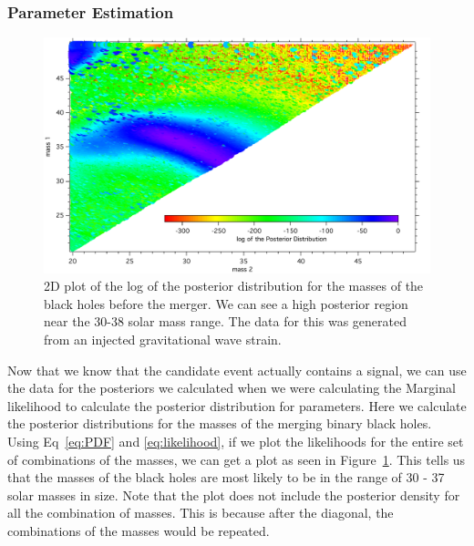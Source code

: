 \documentclass{article}
\begin{document}
 
 
 \subsubsection{Parameter Estimation}
 
     \begin{figure}[h]
     	\centering
     	\includegraphics[width=1\textwidth]{Figures/m1m2.pdf} 
     	\caption{2D plot of the log of the posterior distribution for the masses of the black holes before the merger. We can see a high posterior region near the 30-38 solar mass range. The data for this was generated from an injected gravitational wave strain.}
     	\label{Fig:2Dmasses}
     \end{figure}
 
 Now that we know that the candidate event actually contains a signal, we can use the data for the posteriors we calculated when we were calculating the Marginal likelihood to calculate the posterior distribution for parameters. Here we calculate the posterior distributions for the masses of the merging binary black holes. Using Eq~\ref{eq:PDF} and \ref{eq:likelihood}, if we plot the likelihoods for the entire set of combinations of the masses, we can get a plot as seen in Figure~\ref{Fig:2Dmasses}. This tells us that the masses of the black holes are most likely to be in the range of 30 - 37 solar masses in size. Note that the plot does not include the posterior density for all the combination of masses. This is because after the diagonal, the combinations of the masses would be repeated. \\
 
\end{document}
